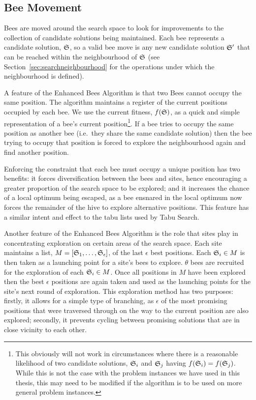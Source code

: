 \subsection{Bee Movement}
\label{sec:beemovement}

Bees are moved around the search space to look for improvements to the collection of candidate solutions being maintained. Each bee represents a candidate solution, $\mathfrak{S}$, so a valid bee move is any new candidate solution $\mathfrak{S}'$ that can be reached within the neighbourhood of $\mathfrak{S}$ (see Section~\ref{sec:searchneighbourhood} for the operations under which the neighbourhood is defined).


A feature of the Enhanced Bees Algorithm is that two Bees cannot occupy the same position. The algorithm maintains a register of the current positions occupied by each bee. We use the current fitness, $f(\mathfrak{S})$, as a quick and simple representation of a bee's current position\footnote{This obviously will not work in circumstances where there is a reasonable likelihood of two candidate solutions, $\mathfrak{S}_i$ and $\mathfrak{S}_j$ having $f(\mathfrak{S}_i) = f(\mathfrak{S}_j)$. While this is not the case with the problem instances we have used in this thesis, this may need to be modified if the algorithm is to be used on more general problem instances.}. If a bee tries to occupy the same position as another bee (i.e.~they share the same candidate solution) then the bee trying to occupy that position is forced to explore the neighbourhood again and find another position. 

Enforcing the constraint that each bee must occupy a unique position has two benefits: it forces diversification between the bees and sites, hence encouraging a greater proportion of the search space to be explored; and it increases the chance of a local optimum being escaped, as a bee ensnared in the local optimum now forces the remainder of the hive to explore alternative positions. This feature has a similar intent and effect to the tabu lists used by Tabu Search.

Another feature of the Enhanced Bees Algorithm is the role that sites play in concentrating exploration on certain areas of the search space. Each site maintains a list, $M = [\mathfrak{S}_1,\ldots, \mathfrak{S}_\epsilon]$, of the last $\epsilon$ best positions. Each $\mathfrak{S}_i \in M$ is then taken as a launching point for a site's bees to explore. $\theta$ bees are recruited for the exploration of each $\mathfrak{S}_i \in M$. Once all positions in $M$ have been explored then the best $\epsilon$ positions are again taken and used as the launching points for the site's next round of exploration. This exploration method has two purposes: firstly, it allows for a simple type of branching, as $\epsilon$ of the most promising positions that were traversed through on the way to the current position are also explored; secondly, it prevents cycling between promising solutions that are in close vicinity to each other.

